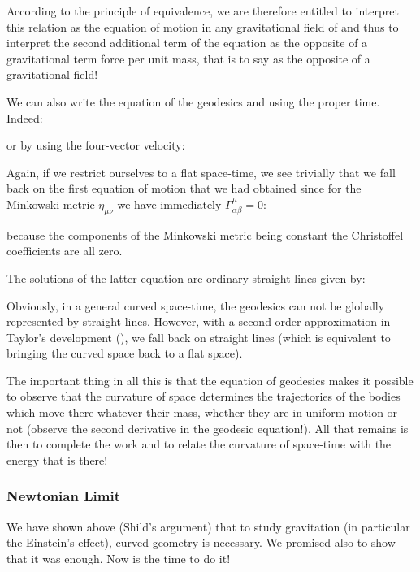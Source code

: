 	According to the principle of equivalence, we are therefore entitled to interpret this relation as the equation of motion in any gravitational field of and thus to interpret the second additional term of the equation as the opposite of a gravitational term force per unit mass, that is to say as the opposite of a gravitational field!
	\begin{tcolorbox}[title=Remark,colframe=black,arc=10pt]
	We can also write the equation of the geodesics and using the proper time. Indeed:
	
	or by using the four-vector velocity:
	
	\end{tcolorbox}
	Again, if we restrict ourselves to a flat space-time, we see trivially that we fall back on the first equation of motion that we had obtained since for the Minkowski metric $\eta_{\mu\nu}$ we have immediately $\Gamma_{\alpha\beta}^\mu=0$:
	
	because the components of the Minkowski metric being constant the Christoffel coefficients are all zero.
	
	The solutions of the latter equation are ordinary straight lines given by:
		
Obviously, in a general curved space-time, the geodesics can not be globally represented by straight lines. However, with a second-order approximation in Taylor's development (), we fall back on straight lines (which is equivalent to bringing the curved space back to a flat space).

	The important thing in all this is that the equation of geodesics makes it possible to observe that the curvature of space determines the trajectories of the bodies which move there whatever their mass, whether they are in uniform motion or not (observe the second derivative in the geodesic equation!). All that remains is then to complete the work and to relate the curvature of space-time with the energy that is there!
	
	\subsubsection{Newtonian Limit}
	We have shown above (Shild's argument) that to study gravitation (in particular the Einstein's effect), curved geometry is necessary. We promised also to show that it was enough. Now is the time to do it!

